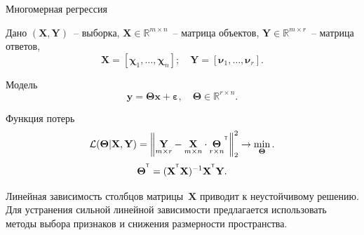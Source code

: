 \documentclass[9pt]{beamer}
\newcommand{\bx}{\mathbf{x}}
\newcommand{\by}{\mathbf{y}}
\newcommand{\bX}{\mathbf{X}}
\newcommand{\bY}{\mathbf{Y}}
\newcommand{\bbR}{\mathbb{R}}
\newcommand{\bchi}{\boldsymbol{\chi}}
\newcommand{\bnu}{\boldsymbol{\nu}}
\newcommand{\bTheta}{\boldsymbol{\Theta}}
\newcommand{\T}{^{\text{\tiny\sffamily\upshape\mdseries T}}}
\begin{document}
\begin{frame}{Многомерная регрессия}
\begin{block}{Дано}
	$\left( \bX, \bY \right)$~-- выборка, $\bX \in \bbR^{m \times n}$~-- матрица объектов, $\bY \in \bbR^{m \times r}$~-- матрица ответов,
	\[
	\bX = [\bchi_1, \dots, \bchi_n]; \quad \bY =  [\bnu_1, \dots, \bnu_r].
	\]
	\vspace{-0.7cm}
\end{block}

\begin{block}{Модель}
	\vspace{-0.3cm}
	\[
	\by = \bTheta \bx+ \boldsymbol{\varepsilon}, \quad \bTheta \in \bbR^{r \times n}.
	\]
	\vspace{-0.5cm}
\end{block}
\begin{block}{Функция потерь}
	\[
	\mathcal{L}(\bTheta | \bX, \bY) = {\left\| \underset{m \times r}{\mathbf{Y}}  - \underset{m \times n}{\bX} \cdot \underset{r \times n}{\bTheta}^{\T} \right\| }_2^2 \rightarrow\min_{\bTheta}.
	\label{eq:error_function}
	\]
	\[
	\bTheta^{\T} = (\bX^{\T} \bX)^{-1} \bX^{\T} \bY.
	\]
\end{block}
Линейная зависимость столбцов матрицы~$\bX$ приводит к неустойчивому решению. \\
Для устранения сильной линейной зависимости предлагается использовать методы выбора признаков и снижения размерности пространства. 
\end{frame}
\end{document}
